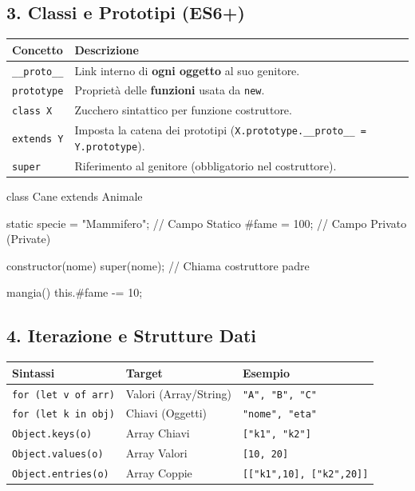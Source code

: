 \subsection{3. Classi e Prototipi (ES6+)}
\begin{center}
\begin{tabular}{|l|p{6cm}|}
\hline
\textbf{Concetto} & \textbf{Descrizione} \\
\hline
\texttt{\_\_proto\_\_} & Link interno di \textbf{ogni oggetto} al suo genitore. \\
\hline
\texttt{prototype} & Proprietà delle \textbf{funzioni} usata da \texttt{new}. \\
\hline
\texttt{class X} & Zucchero sintattico per funzione costruttore. \\
\hline
\texttt{extends Y} & Imposta la catena dei prototipi (\texttt{X.prototype.\_\_proto\_\_ = Y.prototype}). \\
\hline
\texttt{super} & Riferimento al genitore (obbligatorio nel costruttore). \\
\hline
\end{tabular}
\end{center}

\begin{jsbox}
class Cane extends Animale {
    static specie = "Mammifero"; // Campo Statico
    #fame = 100;                 // Campo Privato (Private)

    constructor(nome) {
        super(nome); // Chiama costruttore padre
    }

    mangia() { this.#fame -= 10; }
}
\end{jsbox}

\subsection{4. Iterazione e Strutture Dati}
\begin{center}
\begin{tabular}{|l|p{4cm}|p{4.5cm}|}
\hline
\textbf{Sintassi} & \textbf{Target} & \textbf{Esempio} \\
\hline
\texttt{for (let v of arr)} & Valori (Array/String) & \texttt{"A", "B", "C"} \\
\hline
\texttt{for (let k in obj)} & Chiavi (Oggetti) & \texttt{"nome", "eta"} \\
\hline
\texttt{Object.keys(o)} & Array Chiavi & \texttt{["k1", "k2"]} \\
\hline
\texttt{Object.values(o)} & Array Valori & \texttt{[10, 20]} \\
\hline
\texttt{Object.entries(o)} & Array Coppie & \texttt{[["k1",10], ["k2",20]]} \\
\hline
\end{tabular}
\end{center}

